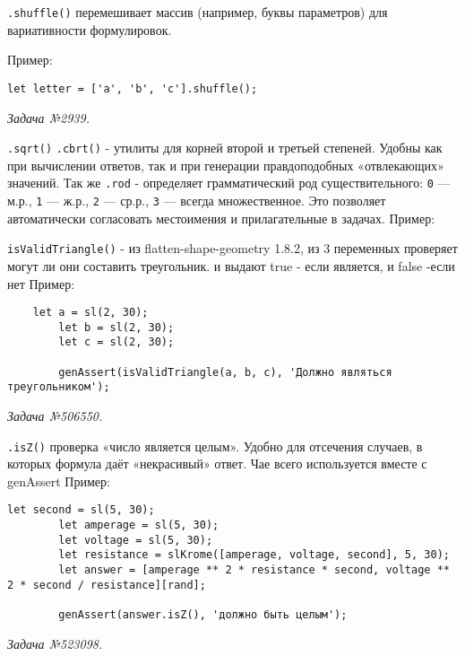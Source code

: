  \texttt{.shuffle()} перемешивает массив (например, буквы параметров) для вариативности формулировок.

Пример:
\begin{lstlisting}
let letter = ['a', 'b', 'c'].shuffle();
\end{lstlisting}
\textsl{Задача №2939.}
 

\texttt{.sqrt()} \texttt{.cbrt()} - утилиты для корней второй и третьей степеней. Удобны как при вычислении ответов, так и при генерации правдоподобных «отвлекающих» значений.
Так же \texttt{.rod} - определяет грамматический род существительного: \verb|0| — м.р., \verb|1| — ж.р., \verb|2| — ср.р., \verb|3| — всегда множественное. 
Это позволяет автоматически согласовать местоимения и прилагательные в задачах.
Пример:
 


\texttt{isValidTriangle()} - из  flatten-shape-geometry 1.8.2, из 3 переменных проверяет могут ли они составить треугольник. и выдают true - если является, и false -если нет
Пример:
\begin{lstlisting}
	let a = sl(2, 30);
		let b = sl(2, 30);
		let c = sl(2, 30);

		genAssert(isValidTriangle(a, b, c), 'Должно являться треугольником');
\end{lstlisting}
\textsl{Задача №506550.}

\texttt{.isZ()} проверка «число является целым». Удобно для отсечения случаев, в которых формула даёт «некрасивый» ответ. Чае всего используется вместе с genAssert   
Пример:
\begin{lstlisting}
let second = sl(5, 30);
		let amperage = sl(5, 30);
		let voltage = sl(5, 30);
		let resistance = slKrome([amperage, voltage, second], 5, 30);
		let answer = [amperage ** 2 * resistance * second, voltage ** 2 * second / resistance][rand];

		genAssert(answer.isZ(), 'должно быть целым');
\end{lstlisting}
\textsl{Задача №523098.}



